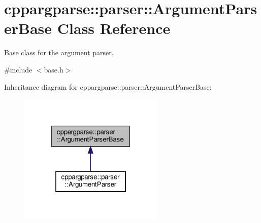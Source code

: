 \hypertarget{classcppargparse_1_1parser_1_1ArgumentParserBase}{}\section{cppargparse\+:\+:parser\+:\+:Argument\+Parser\+Base Class Reference}
\label{classcppargparse_1_1parser_1_1ArgumentParserBase}


Base class for the argument parser.  




{\ttfamily \#include $<$base.\+h$>$}



Inheritance diagram for cppargparse\+:\+:parser\+:\+:Argument\+Parser\+Base\+:\nopagebreak
\begin{figure}[H]
\begin{center}
\leavevmode
\includegraphics[width=196pt]{classcppargparse_1_1parser_1_1ArgumentParserBase__inherit__graph}
\end{center}
\end{figure}
